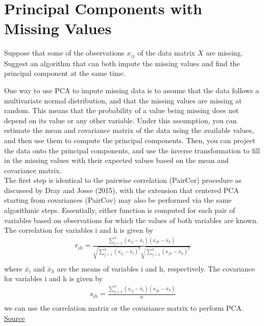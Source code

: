 \documentclass[12pt]{article}
\begin{document}
\section{Principal Components with Missing Values}
Suppose that some of the observations $x_{ij}$ of the data matrix $X$ are missing. Suggest an
algorithm that can both impute the missing values and find the principal component at the
same time.
\begin{qsolve}
    One way to use PCA to impute missing data is to assume that the data follows a multivariate normal distribution, and that the missing values are missing at random. This means that the probability of a value being missing does not depend on its value or any other variable. Under this assumption, you can estimate the mean and covariance matrix of the data using the available values, and then use them to compute the principal components. Then, you can project the data onto the principal components, and use the inverse transformation to fill in the missing values with their expected values based on the mean and covariance matrix.\\
    \splitqsolve
    The first step is identical to the pairwise correlation (PairCor) procedure as discussed by Dray and Josse (2015), with the extension that centered PCA starting from covariances (PairCov) may also be performed via the same algorithmic steps. Essentially, either function is computed for each pair of variables based on observations for which the values of both variables are known. The correlation for variables i and h is given by
    \begin{gather*}
        r_{ih} = \frac{\sum_{j=1}^{n} (x_{ij} - \bar{x}_{i})(x_{jh} - \bar{x}_{h})}{\sqrt{\sum_{j=1}^{n} (x_{ij} - \bar{x}_{i})^2} \sqrt{\sum_{j=1}^{n} (x_{jh} - \bar{x}_{h})^2}} \\
    \end{gather*}
    where $\bar{x}_{i}$ and $\bar{x}_{h}$ are the means of variables i and h, respectively. The covariance for variables i and h is given by
    \begin{gather*}
        s_{ih} = \frac{\sum_{j=1}^{n} (x_{ij} - \bar{x}_{i})(x_{jh} - \bar{x}_{h})}{n} \\
    \end{gather*}
    we can use the correlation matrix or the covariance matrix to perform PCA.
    \\
    \href{https://www.sciencedirect.com/science/article/pii/S1574954121000261}{Source}
\end{qsolve}
\end{document}
